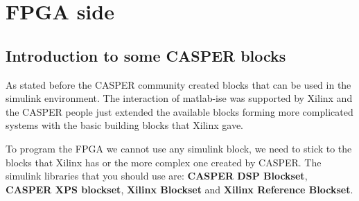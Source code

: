 \section{FPGA side}

\subsection{Introduction to some CASPER blocks}
As stated before the CASPER community created blocks that can be used in the simulink environment. The interaction of matlab-ise was supported by Xilinx and the CASPER people just extended the available blocks forming more complicated systems with the basic building blocks that Xilinx gave.

To program the FPGA we cannot use any simulink block, we need to stick to the blocks that Xilinx has or the more complex one created by CASPER. The simulink libraries that you should use are: \textbf{CASPER DSP Blockset}, \textbf{CASPER XPS blockset}, \textbf{Xilinx Blockset} and \textbf{Xilinx Reference Blockset}.

